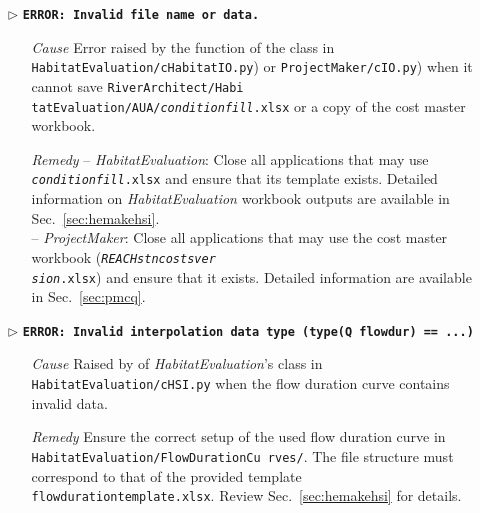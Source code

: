 \begin{itemize}
	\item[$\triangleright$]\textbf{\texttt{ERROR: Invalid file name or data.}}
	\begin{itemize}
		\item[\textit{Cause}\hspace{0.27cm}] Error raised by the  function of the  class in \texttt{HabitatEvaluation/cHabitatIO.py}) or \texttt{ProjectMaker/cIO.py}) when it cannot save \texttt{RiverArchitect/Habi tatEvaluation/AUA/\textit{condition}{\myUnderscore}\textit{fill}.xlsx} or a copy of the cost master workbook.
		\item[\textit{Remedy}] -- \textit{HabitatEvaluation}: Close all applications that may use \texttt{\textit{condition}{\myUnderscore}\textit{fill}.xlsx} and ensure that its template exists. Detailed information on \textit{HabitatEvaluation} workbook outputs are available in Sec.~\ref{sec:hemakehsi}.\\
		-- \textit{ProjectMaker}:  Close all applications that may use the cost master workbook (\texttt{\emph{REACH}{\myUnderscore}\emph{stn}{\myUnderscore}\emph{costs}{\myUnderscore}\emph{ver}\\\emph{sion}.xlsx}) and ensure that it exists. Detailed information are available in Sec.~\ref{sec:pmcq}.\\
	\end{itemize}
	
	\item[$\triangleright$]\textbf{\texttt{ERROR: Invalid interpolation data type (type(Q flowdur) ==  ...)}}
	\begin{itemize}
		\item[\textit{Cause}\hspace{0.27cm}] Raised by  of \textit{HabitatEvaluation}'s  class in \texttt{HabitatEvaluation/cHSI.py} when the flow duration curve contains invalid data.
		\item[\textit{Remedy}] Ensure the correct setup of the used flow duration curve in \texttt{HabitatEvaluation/FlowDurationCu rves/}. The file structure must correspond to that of the provided template \texttt{flow{\myUnderscore}duration{\myUnderscore}template.xlsx}. Review Sec.~\ref{sec:hemakehsi} for details.\\
	\end{itemize}
	

\end{itemize}
